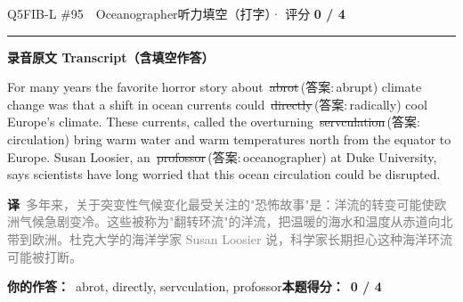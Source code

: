 \documentclass[11pt]{article}
\newcommand{\ptesub}[1]{%
  \par\needspace{2\baselineskip}\smallskip
  {\color{cAccent}\rule[-0.2ex]{3pt}{1.05em}}\hspace{6pt}%
  {\bfseries\color{cHead}#1}\par\nopagebreak\smallskip}
\newcommand{\zh}[1]{{\footnotesize\textcolor{cNote}{\textbf{译}}\ \textcolor{gray}{#1}}}
\newcommand{\rno}[2]{{\color{cWrong}\ding{55}\,\sout{#1}}\,{\footnotesize\color{cFix}(答案:\,#2)}}  %
\begin{document}
\begin{qblock}{Q5\quad FIB-L \#95\ \ Oceanographer}{听力填空（打字）· 评分 \textcolor{cAccent}{\bfseries 0 / 4}}
\ptesub{录音原文 Transcript（含填空作答）}
\begin{promptbox}
For many years the favorite horror story about \rno{abrot}{abrupt} climate change was that a shift in ocean currents could \rno{directly}{radically} cool Europe's climate. These currents, called the overturning \rno{servculation}{circulation} bring warm water and warm temperatures north from the equator to Europe. Susan Loosier, an \rno{profossor}{oceanographer} at Duke University, says scientists have long worried that this ocean circulation could be disrupted.
\end{promptbox}
\zh{多年来，关于突变性气候变化最受关注的"恐怖故事"是：洋流的转变可能使欧洲气候急剧变冷。这些被称为"翻转环流"的洋流，把温暖的海水和温度从赤道向北带到欧洲。杜克大学的海洋学家 Susan Loosier 说，科学家长期担心这种海洋环流可能被打断。}
\par\smallskip
\textbf{你的作答：}\ {\color{cWrong}abrot, directly, servculation, profossor}\qquad\textbf{本题得分：}\ {\color{cAccent}\bfseries 0 / 4}
\end{qblock}
\end{document}
